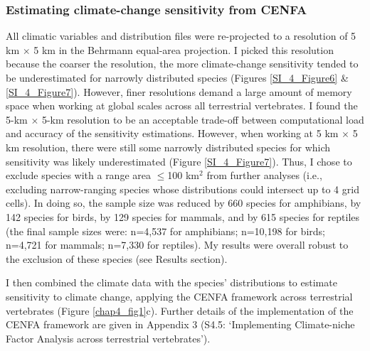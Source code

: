 \subsubsection{Estimating climate-change sensitivity from CENFA}
All climatic variables and distribution files were re-projected to a resolution of 5 km $\times$ 5 km in the Behrmann equal-area projection. I picked this resolution because the coarser the resolution, the more climate-change sensitivity tended to be underestimated for narrowly distributed species (Figures \ref{SI_4_Figure6} \& \ref{SI_4_Figure7}). However, finer resolutions demand a large amount of memory space when working at global scales across all terrestrial vertebrates. I found the 5-km $\times$ 5-km resolution to be an acceptable trade-off between computational load and accuracy of the sensitivity estimations. However, when working at 5 km $\times$ 5 km resolution, there were still some narrowly distributed species for which sensitivity was likely underestimated (Figure \ref{SI_4_Figure7}). Thus, I chose to exclude species with a range area $\leq$100 km$^2$ from further analyses (i.e., excluding narrow-ranging species whose distributions could intersect up to 4 grid cells). In doing so, the sample size was reduced by 660 species for amphibians, by 142 species for birds, by 129 species for mammals, and by 615 species for reptiles (the final sample sizes were: n=4,537 for amphibians; n=10,198 for birds; n=4,721 for mammals; n=7,330 for reptiles). My results were overall robust to the exclusion of these species (see Results section). 

I then combined the climate data with the species' distributions to estimate sensitivity to climate change, applying the CENFA framework across terrestrial vertebrates (Figure \ref{chap4_fig1}c). Further details of the implementation of the CENFA framework are given in Appendix 3 (S4.5: `Implementing Climate-niche Factor Analysis across terrestrial vertebrates').


